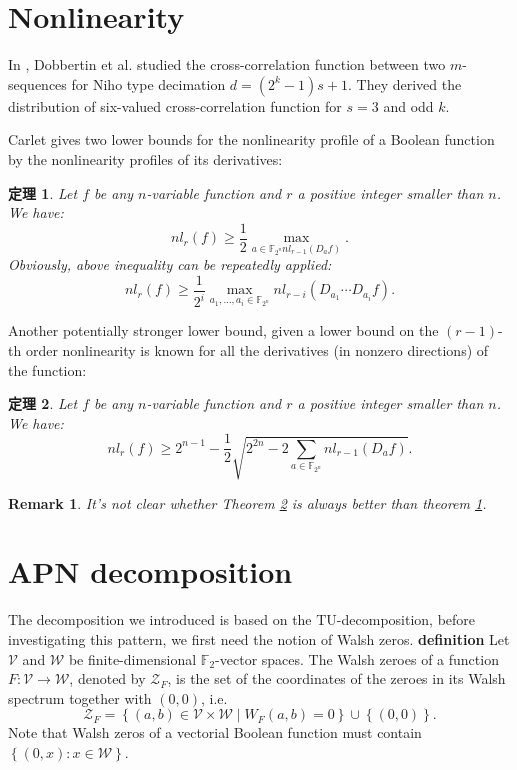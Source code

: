 \documentclass[12pt,a4paper]{ctexbook}
\newcommand{\0}{\textbf{0}}
\newcommand{\1}{\textbf{1}}
\newcommand{\F}{\mathbb{F}}
\newtheorem{theorem}{定理}
\newtheorem{remark}{Remark}
\begin{document}
\section{Nonlinearity}

    In \cite{dobbertin2006niho_dickson_kloosterman}, Dobbertin et al. studied the cross-correlation function between two 
    $ m $-sequences for Niho type decimation $ d=(2^k-1)s+1 $. 
    They derived the distribution of six-valued cross-correlation function for $ s=3 $ and odd $ k $. 

    Carlet\cite{Carlet2008lowbound_NL_profile} gives two lower bounds for the nonlinearity profile of a Boolean function 
    by the nonlinearity profiles of its derivatives: 
    \begin{theorem}\label{TH:NL_onederivate}
        Let $f$ be any $ n $-variable function and $ r $ a positive integer smaller than $ n $. We have:
        \[nl_r(f)\ge\frac{1}{2}\max_{a\in\F_{2^n}nl_{r-1}(D_af)}.\]
        Obviously, above inequality can be repeatedly applied: 
        \[nl_r(f)\ge \frac{1}{2^i}\max_{a_1,\dots,a_i\in\F_{2^n}}nl_{r-i}(D_{a_1}\cdots D_{a_i}f).\]
    \end{theorem}
    Another potentially stronger lower bound, given a lower bound on the $ (r-1) $-th order nonlinearity is 
    known for all the derivatives (in nonzero directions) of the function:
    \begin{theorem}\label{TH:NL_allderivates}
        Let $f$ be any $ n $-variable function and $ r $ a positive integer smaller than $ n $. We have:
        \[nl_r(f) \ge 2^{n-1} -\frac{1}{2}\sqrt{2^{2n}-2\sum_{a\in\F_{2^n}}nl_{r-1}(D_af)}.\]
    \end{theorem}
    \begin{remark}
        It's not clear whether Theorem \ref{TH:NL_allderivates} is always better than theorem \ref{TH:NL_onederivate}.
    \end{remark}

\section{APN decomposition}
    The decomposition \cite{BeierleCLP2022ninebitAPNpermutation_error} we introduced 
    is based on the TU-decomposition, before investigating this pattern, we first need the notion of Walsh zeros.
    \textbf{definition}
        Let $ \mathcal{V} $ and $ \mathcal{W} $  be finite-dimensional $\F_2 $-vector spaces. 
        The Walsh zeroes of a function $ F : \mathcal{V}\rightarrow \mathcal{W} $, denoted by $ \mathcal{Z}_F $, 
        is the set of the coordinates of the zeroes in its Walsh spectrum together with $ (0, 0) $, i.e. 
        \[\mathcal{Z}_F=\left\{ (a,b)\in\mathcal{V}\times\mathcal{W}\mid W_F(a,b)=0 \right\}\cup\left\{ (0,0) \right\}.\]
    Note that Walsh zeros of a vectorial Boolean function must contain $ \left\{ (0,x):x\in\mathcal{W} \right\} $.

    

\end{document}
